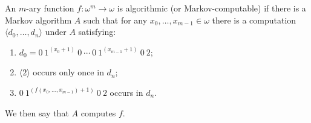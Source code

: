 An $m$-ary function $f \colon \omega^m \to \omega$ is algorithmic (or Markov-computable) if there is a Markov algorithm $A$ such that for any $x_0, \ldots, x_{m-1} \in \omega$ there is a computation $\langle d_0, \ldots, d_n \rangle$ under $A$ satisfying:

\begin{enumerate}
\item $d_0 = 0\ 1^{(x_0 + 1)}\ 0\ \cdots\ 0\ 1^{(x_{m-1} + 1)}\ 0\ 2$;
\item $\langle 2 \rangle$ occurs only once in $d_n$;
\item $0\ 1^{(f(x_0, \ldots, x_{m-1}) + 1)}\ 0\ 2$ occurs in $d_n$.
\end{enumerate}

We then say that $A$ computes $f$.
